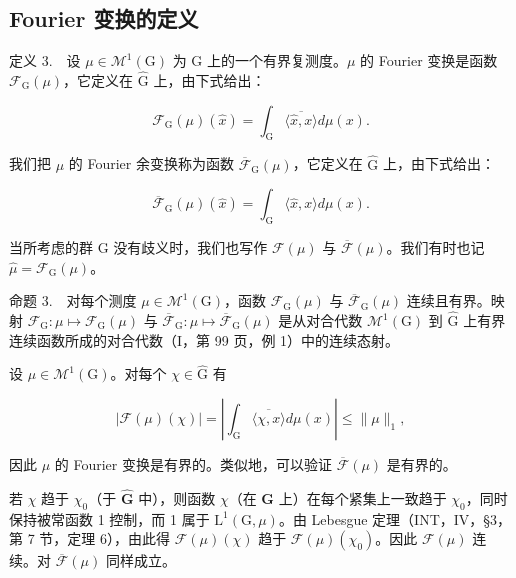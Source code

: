 \subsection{Fourier 变换的定义}

定义 3.　设 \(\mu \in \mathcal{M}^{1}(\mathrm{G})\) 为 G 上的一个有界复测度。\(\mu\) 的 Fourier 变换是函数 \(\mathcal{F}_{\mathrm{G}}(\mu)\)，它定义在 \(\widehat{\mathrm{G}}\) 上，由下式给出：

\[
\mathcal {F} _ {\mathrm{G}} (\mu) (\widehat {x}) = \int_ {\mathrm{G}} \overline {{\langle \widehat {x} , x \rangle}} d \mu (x).\tag{5}
\]

我们把 \(\mu\) 的 Fourier 余变换称为函数 \(\overline{\mathcal{F}}_{\mathrm{G}}(\mu)\)，它定义在 \(\widehat{\mathrm{G}}\) 上，由下式给出：

\[
\overline {{\mathcal {F}}} _ {\mathrm{G}} (\mu) (\widehat {x}) = \int_ {\mathrm{G}} \langle \widehat {x}, x \rangle d \mu (x).\tag{6}
\]

当所考虑的群 G 没有歧义时，我们也写作 \(\mathcal{F}(\mu)\) 与 \(\overline{\mathcal{F}}(\mu)\)。我们有时也记 \(\widehat{\mu} = \mathcal{F}_{\mathrm{G}}(\mu)\)。

命题 3.　对每个测度 \(\mu \in \mathcal{M}^{1}(\mathrm{G})\)，函数 \(\mathcal{F}_{\mathrm{G}}(\mu)\) 与 \(\overline{\mathcal{F}}_{\mathrm{G}}(\mu)\) 连续且有界。映射 \(\mathcal{F}_{\mathrm{G}}: \mu \mapsto \mathcal{F}_{\mathrm{G}}(\mu)\) 与 \(\overline{\mathcal{F}}_{\mathrm{G}}: \mu \mapsto \overline{\mathcal{F}}_{\mathrm{G}}(\mu)\) 是从对合代数 \(\mathcal{M}^{1}(\mathrm{G})\) 到 \(\widehat{\mathrm{G}}\) 上有界连续函数所成的对合代数（I，第 99 页，例 1）中的连续态射。

设 \(\mu \in \mathcal{M}^1 (\mathrm{G})\)。对每个 \(\chi \in \widehat{\mathrm{G}}\) 有

\[
| \mathcal {F} (\mu) (\chi) | = \left| \int_ {\mathrm{G}} \overline {{\langle \chi , x \rangle}} d \mu (x) \right| \leqslant \| \mu \| _ {1},\tag{7}
\]

因此 \(\mu\) 的 Fourier 变换是有界的。类似地，可以验证 \(\overline{\mathcal{F}}(\mu)\) 是有界的。

若 \(\chi\) 趋于 \(\chi_0\)（于 \(\widehat{\mathbf{G}}\) 中），则函数 \(\chi\)（在 \(\mathbf{G}\) 上）在每个紧集上一致趋于 \(\chi_0\)，同时保持被常函数 1 控制，而 1 属于 \(\mathrm{L}^1 (\mathrm{G},\mu)\)。由 Lebesgue 定理（INT，IV，§3，第 7 节，定理 6），由此得 \(\mathcal{F}(\mu)(\chi)\) 趋于 \(\mathcal{F}(\mu)(\chi_0)\)。因此 \(\mathcal{F}(\mu)\) 连续。对 \(\overline{\mathcal{F}} (\mu)\) 同样成立。

